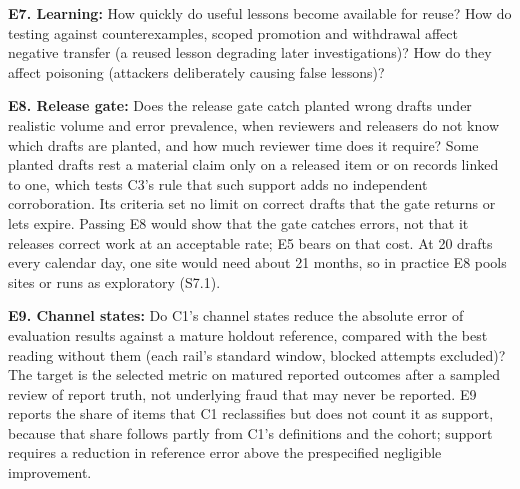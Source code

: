 \documentclass[
  11pt,
]{article}
\begin{document}
\textbf{E7. Learning:} How quickly do useful lessons become available
for reuse? How do testing against counterexamples, scoped promotion and
withdrawal affect negative transfer (a reused lesson degrading later
investigations)? How do they affect poisoning (attackers deliberately
causing false lessons)?

\textbf{E8. Release gate:} Does the release gate catch planted wrong
drafts under realistic volume and error prevalence, when reviewers and
releasers do not know which drafts are planted, and how much reviewer
time does it require? Some planted drafts rest a material claim only on
a released item or on records linked to one, which tests C3's rule that
such support adds no independent corroboration. Its criteria set no
limit on correct drafts that the gate returns or lets expire. Passing E8
would show that the gate catches errors, not that it releases correct
work at an acceptable rate; E5 bears on that cost. At 20 drafts every
calendar day, one site would need about 21 months, so in practice E8
pools sites or runs as exploratory (S7.1).

\textbf{E9. Channel states:} Do C1's channel states reduce the absolute
error of evaluation results against a mature holdout reference, compared
with the best reading without them (each rail's standard window, blocked
attempts excluded)? The target is the selected metric on matured
reported outcomes after a sampled review of report truth, not underlying
fraud that may never be reported. E9 reports the share of items that C1
reclassifies but does not count it as support, because that share
follows partly from C1's definitions and the cohort; support requires a
reduction in reference error above the prespecified negligible
improvement.
\end{document}
